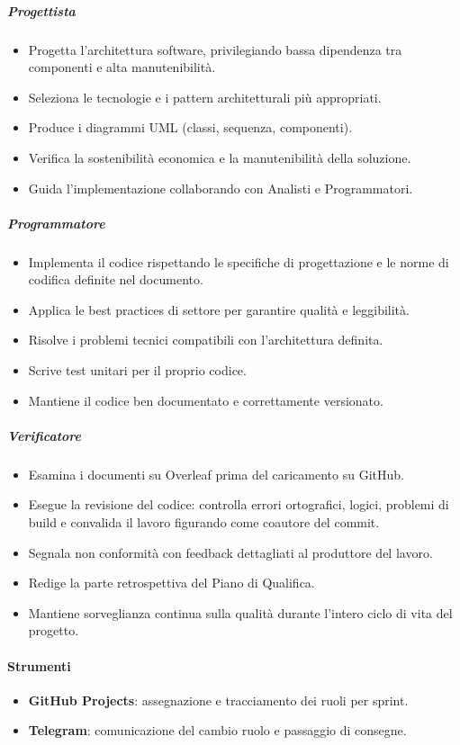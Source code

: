 \documentclass[a4paper, 11pt, oneside]{scrartcl}
\begin{document}
\subparagraph{Progettista}
\begin{itemize}
    \item Progetta l'architettura software, privilegiando bassa dipendenza tra componenti e alta manutenibilità.
    \item Seleziona le tecnologie e i pattern architetturali{\scriptsize{}} più appropriati.
    \item Produce i diagrammi UML (classi, sequenza, componenti).
    \item Verifica la sostenibilità economica e la manutenibilità della soluzione.
    \item Guida l'implementazione collaborando con Analisti e Programmatori.
\end{itemize}

\subparagraph{Programmatore}
\begin{itemize}
    \item Implementa il codice rispettando le specifiche di progettazione e le norme di codifica definite nel documento.
    \item Applica le best practices{\scriptsize{}} di settore per garantire qualità e leggibilità.
    \item Risolve i problemi tecnici compatibili con l'architettura definita.
    \item Scrive test unitari per il proprio codice.
    \item Mantiene il codice ben documentato e correttamente versionato.
\end{itemize}

\subparagraph{Verificatore}
\begin{itemize}
    \item Esamina i documenti su Overleaf prima del caricamento su GitHub.
    \item Esegue la revisione del codice: controlla errori ortografici, logici, problemi di build e convalida il lavoro figurando come coautore del commit.
    \item Segnala non conformità con feedback dettagliati al produttore del lavoro.
    \item Redige la parte retrospettiva del Piano di Qualifica{\scriptsize{}}.
    \item Mantiene sorveglianza continua sulla qualità durante l'intero ciclo di vita del progetto.
\end{itemize}

\paragraph{Strumenti}
\begin{itemize}
    \item \textbf{GitHub Projects}: assegnazione e tracciamento dei ruoli per sprint.
    \item \textbf{Telegram}: comunicazione del cambio ruolo e passaggio di consegne.
\end{itemize}
\end{document}
